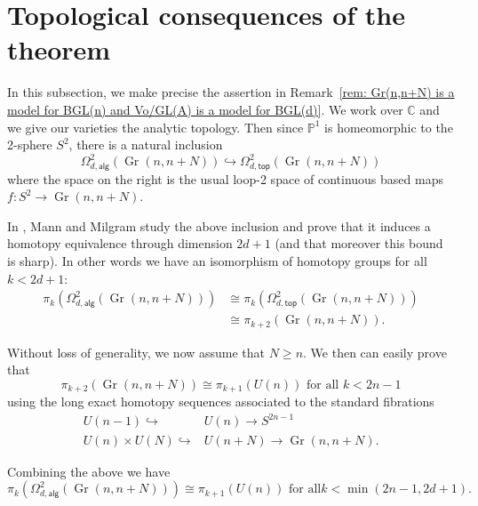 \documentclass{amsart}
\theoremstyle{definition}
\newcommand{\CC} {{\mathbb C}}          %
\newcommand{\PP}{\mathbb{P}}
\newcommand{\alg}{\mathsf{alg}}
\renewcommand{\top}{\mathsf{top}}
\newcommand{\Gr}{\operatorname{Gr}}
\newcommand{\LoopTwo}{\Omega^{2}_{d,\alg}}
\newcommand{\LoopTwoTop}{\Omega^{2}_{d,\top}}
\begin{document}
\section{Topological consequences of the theorem}\label{sec:
topological consequences}

In this subsection, we make precise the assertion in Remark~\ref{rem:
Gr(n,n+N) is a model for BGL(n) and Vo/GL(A) is a model for
BGL(d)}. We work over $\CC$ and we give our varieties the analytic
topology. Then since $\PP^{1}$ is homeomorphic to the 2-sphere
$S^{2}$, there is a natural inclusion
\[
\LoopTwo (\Gr (n,n+N))\hookrightarrow \LoopTwoTop  (\Gr (n,n+N))
\]
where the space on the right is the usual loop-2 space of continuous
based maps $f:S^{2}\to \Gr (n,n+N)$.

In \cite{Mann-Milgram-93}, Mann and Milgram study the above inclusion
and prove that it induces a homotopy equivalence through dimension
$2d+1$ (and that moreover this bound is sharp). In other words we have
an isomorphism of homotopy groups for all $k<2d+1$:
\begin{align*}
\pi_{k}(\LoopTwo (\Gr (n,n+N))) &\cong \pi_{k}(\LoopTwoTop (\Gr (n,n+N)))\\
&\cong \pi_{k+2}(\Gr (n,n+N)).
\end{align*}

Without loss of generality, we now assume that $N\geq n$. We then can
easily prove that 
\[
\pi_{k+2}(\Gr (n,n+N))\cong \pi_{k+1}(U(n)) \text{ for all $k<2n-1$}
\]
using the long exact homotopy sequences associated to the standard
fibrations 
\begin{align*}
U(n-1)\hookrightarrow &U(n) \to S^{2n-1}\\
U(n)\times U(N) \hookrightarrow & U(n+N)  \to \Gr (n,n+N).
\end{align*}

Combining the above we have
\begin{equation}\label{eqn: pik(loop2alg)=pik+1(U(n))}
\pi_{k}(\LoopTwo (\Gr (n,n+N))) \cong \pi_{k+1}(U(n)) \text{  for all
} k<\min (2n-1,2d+1).
\end{equation}
\end{document}
